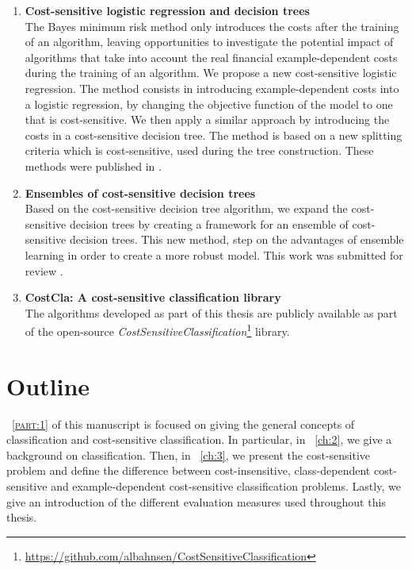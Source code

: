 \begin{enumerate}
\item \textbf{Cost-sensitive logistic regression and decision trees} \\
  The Bayes minimum risk method only introduces the costs after the training of an algorithm, leaving
  opportunities to investigate the potential impact of algorithms that take into account the real 
  financial example-dependent costs during the training of an algorithm. We propose a new 
  cost-sensitive logistic regression. The   method consists in introducing example-dependent costs 
  into a logistic regression, by  changing   the objective function of the model to one that is  
  cost-sensitive. We then apply a   similar approach by introducing the costs in a cost-sensitive 
  decision tree. The method is based on a new splitting criteria which is cost-sensitive, used 
  during the tree construction. 
  These methods were published in \citep{CorreaBahnsen2014b,CorreaBahnsen2015}.
  
\item \textbf{Ensembles of cost-sensitive decision trees} \\
  Based on the cost-sensitive decision tree algorithm, we expand the cost-sensitive decision trees
   by creating a framework for an ensemble of cost-sensitive decision trees. This new 
  method, step on the advantages of ensemble learning in order to create a more robust model.
  This work was submitted for review \citep{CorreaBahnsen2015b}.
  
\item \textbf{CostCla: A cost-sensitive classification library} \\
  The algorithms developed as part of this thesis are publicly available as part of the open-source 
  \textit{CostSensitiveClassification}\footnote{
  \url{https://github.com/albahnsen/CostSensitiveClassification}} library.
  
\end{enumerate}

\section{Outline}

\partname{~\textsc{\ref{part:1}}} of this manuscript is focused on giving the general concepts of 
classification and cost-sensitive classification. In particular, in \chaptername{~\ref{ch:2}}, we 
give a background on classification. Then, in \chaptername{~\ref{ch:3}}, we present 
the cost-sensitive problem and define the difference between 
cost-insensitive, class-dependent cost-sensitive and example-dependent cost-sensitive 
classification problems. Lastly, we give an introduction of the different evaluation measures 
used throughout this thesis.


